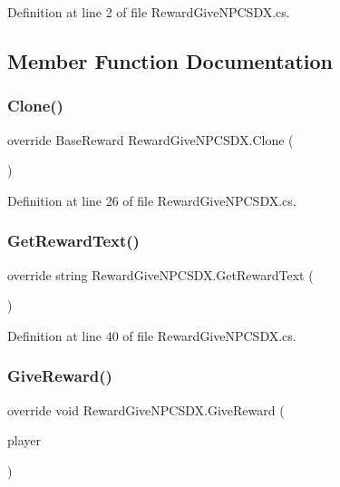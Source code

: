 Definition at line 2 of file Reward\+Give\+N\+P\+C\+S\+D\+X.\+cs.



\subsection{Member Function Documentation}
\mbox{\label{class_reward_give_n_p_c_s_d_x_a6f05c8061604c9402ffe4687b3647e29}} 
\subsubsection{\texorpdfstring{Clone()}{Clone()}}
{\footnotesize\ttfamily override Base\+Reward Reward\+Give\+N\+P\+C\+S\+D\+X.\+Clone (\begin{DoxyParamCaption}{ }\end{DoxyParamCaption})}



Definition at line 26 of file Reward\+Give\+N\+P\+C\+S\+D\+X.\+cs.

\mbox{\label{class_reward_give_n_p_c_s_d_x_a63788494596222b338f91a4c4e643ef7}} 
\subsubsection{\texorpdfstring{GetRewardText()}{GetRewardText()}}
{\footnotesize\ttfamily override string Reward\+Give\+N\+P\+C\+S\+D\+X.\+Get\+Reward\+Text (\begin{DoxyParamCaption}{ }\end{DoxyParamCaption})}



Definition at line 40 of file Reward\+Give\+N\+P\+C\+S\+D\+X.\+cs.

\mbox{\label{class_reward_give_n_p_c_s_d_x_ac25cf8c7da450ff19403ac2be58d40cd}} 
\subsubsection{\texorpdfstring{GiveReward()}{GiveReward()}}
{\footnotesize\ttfamily override void Reward\+Give\+N\+P\+C\+S\+D\+X.\+Give\+Reward (\begin{DoxyParamCaption}\item[{Entity\+Player}]{player }\end{DoxyParamCaption})}



